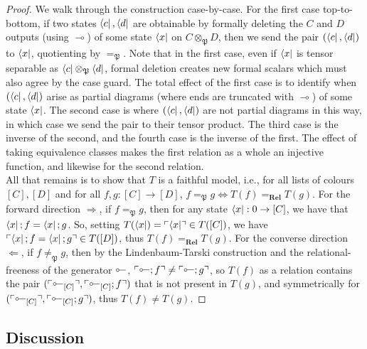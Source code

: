 \begin{fullwidth}
\begin{theorem}
\begin{proof}
We walk through the construction case-by-case. For the first case top-to-bottom, if two states $\bra{c},\bra{d}$ are obtainable by formally deleting the $C$ and $D$ outputs (using $\multimap$) of some state $\bra{x}$ on $C \otimes_\mathfrak{P} D$, then we send the pair $(\bra{c},\bra{d})$ to $\bra{x}$, quotienting by $=_\mathfrak{P}$. Note that in the first case, even if $\bra{x}$ is tensor separable as $\bra{c} \otimes_\mathfrak{P} \bra{d}$, formal deletion creates new formal scalars which must also agree by the case guard. The total effect of the first case is to identify when $(\bra{c},\bra{d})$ arise as partial diagrams (where ends are truncated with $\multimap$) of some state $\bra{x}$. The second case is where $(\bra{c},\bra{d})$ are not partial diagrams in this way, in which case we send the pair to their tensor product. The third case is the inverse of the second, and the fourth case is the inverse of the first. The effect of taking equivalence classes makes the first relation as a whole an injective function, and likewise for the second relation.\\

All that remains is to show that $T$ is a faithful model, i.e., for all lists of colours $[C],[D]$ and for all $f,g : [C] \rightarrow [D]$, $f =_\mathfrak{P} g \iff T(f) =_\textbf{Rel} T(g)$. For the forward direction $\Rightarrow$, if $f =_\mathfrak{P} g$, then for any state $\bra{x} : 0 \rightarrow [C]$, we have that $\bra{x};f = \bra{x};g$. So, setting $T(\bra{x}) = \ulcorner \bra{x} \urcorner \in T([C])$, we have $\ulcorner \bra{x};f = \bra{x};g \urcorner \in T([D])$, thus $T(f) =_\textbf{Rel} T(g)$. For the converse direction $\Leftarrow$, if $f \neq_\mathfrak{P} g$, then by the Lindenbaum-Tarski construction and the relational-freeness of the generator $\rotatebox[origin=c]{180}{$\multimap$}$, $\ulcorner \rotatebox[origin=c]{180}{$\multimap$};f \urcorner \neq \ulcorner \rotatebox[origin=c]{180}{$\multimap$};g \urcorner$, so $T(f)$ as a relation contains the pair $(\ulcorner \rotatebox[origin=c]{180}{$\multimap$}_{[C]} \urcorner, \ulcorner \rotatebox[origin=c]{180}{$\multimap$}_{[C]};f \urcorner)$ that is not present in $T(g)$, and symmetrically for $(\ulcorner \rotatebox[origin=c]{180}{$\multimap$}_{[C]} \urcorner, \ulcorner \rotatebox[origin=c]{180}{$\multimap$}_{[C]};g \urcorner)$, thus $T(f) \neq T(g)$.
\end{proof}
\end{theorem}

\subsection{Discussion}

\begin{example}[]

\end{example}

\end{fullwidth}